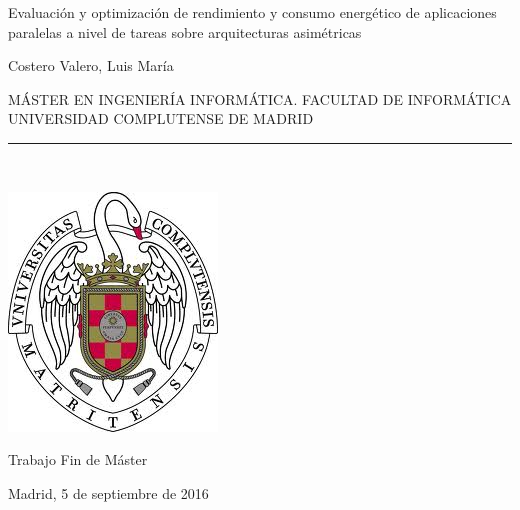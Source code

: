 \begin{center}

   \vspace{1cm}


   {\Large Evaluación y optimización de rendimiento y consumo energético de aplicaciones
	paralelas a nivel de tareas sobre arquitecturas asimétricas}\\

   \vspace{0.5cm}



   \vspace{0.5cm}



   {\large Costero Valero, Luis María}\\

   \vspace{0.5cm}

   MÁSTER EN INGENIERÍA INFORMÁTICA. FACULTAD DE INFORMÁTICA\\ 
   UNIVERSIDAD COMPLUTENSE DE MADRID \\

   \vspace{0.65cm}
   \rule{2in}{0.5pt}\\
   \vspace{0.85cm}

  \includegraphics[height=2.5in]{Figures/escudo.jpg}
  

   \vspace{0.5cm}
Trabajo Fin de Máster 

   \vspace{0.5cm}






  Madrid, 5 de septiembre de 2016\\
   \vspace{2cm}

\end{center}

